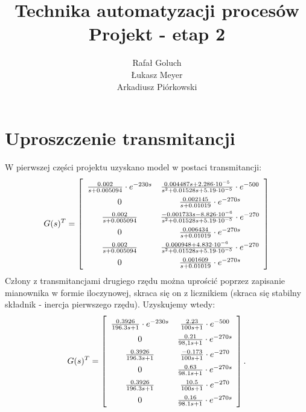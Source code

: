 \documentclass{article}
\title{Technika automatyzacji procesów\\ Projekt - etap 2}
\author{Rafał Goluch \\ Łukasz Meyer\\ Arkadiusz Piórkowski}
\begin{document}



\maketitle

\section{Uproszczenie transmitancji}
W pierwszej części projektu uzyskano model w postaci transmitancji:
\[
G(s)^T = \left[
\arraycolsep=5pt\def\arraystretch{1.5}
\begin{array}{cc}
\frac{0.002}{s+0.005094}\cdot e^{-230s} & \frac{0.004487s+2.286\cdot 10^{-5}}{s^2+0.01528s+5.19\cdot 10^{-5}}\cdot e^{-500} \\
0 & \frac{0.002145}{s+0.01019}\cdot e^{-270s} \\
\frac{0.002}{s+0.005094} & \frac{-0.001733s-8.826\cdot 10^{-6}}{s^2+0.01528s+5.19\cdot 10^{-5}}\cdot e^{-270} \\
0 & \frac{0.006434}{s+0.01019}\cdot e^{-270s} \\
\frac{0.002}{s+0.005094} & \frac{0.000948+4.832\cdot 10^{-6}}{s^2+0.01528s+5.19\cdot 10^{-5}}\cdot e^{-270} \\
0 & \frac{0.001609}{s+0.01019}\cdot e^{-270s}
\end{array}
\right]
\]
Człony z transmitancjami drugiego rzędu można uprościć poprzez zapisanie mianownika w formie iloczynowej, skraca się on z licznikiem (skraca się stabilny składnik - inercja pierwszego rzędu). Uzyskujemy wtedy:
\[
G(s)^T = \left[
\arraycolsep=5pt\def\arraystretch{1.5}
\begin{array}{cc}
\frac{0.3926}{196.3s+1}\cdot e^{-230s} & \frac{2.23}{100s+1}\cdot e^{-500} \\
0 & \frac{0.21}{98,1s+1}\cdot e^{-270s} \\
\frac{0.3926}{196.3s+1} & \frac{-0.173}{100s+1}\cdot e^{-270} \\
0 & \frac{0.63}{98.1s+1}\cdot e^{-270s} \\
\frac{0.3926}{196.3s+1} & \frac{10.5}{100s+1}\cdot e^{-270} \\
0 & \frac{0.16}{98.1s+1}\cdot e^{-270s}
\end{array}
\right].
\]

\newpage
\end{document}
